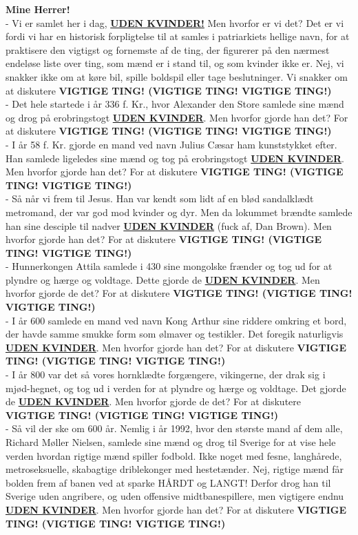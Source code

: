 \textbf{Mine Herrer!}\\
- Vi er samlet her i dag, \underline{\textbf{UDEN KVINDER!}} Men hvorfor er vi det? Det er vi fordi vi har en historisk forpligtelse til at samles i patriarkiets hellige navn, for at praktisere den vigtigst og fornemste af de ting, der figurerer på den nærmest endeløse liste over ting, som mænd er i stand til, og som kvinder ikke er. Nej, vi snakker ikke om at køre bil, spille boldspil eller tage beslutninger. Vi snakker om at diskutere \textbf{VIGTIGE TING! (VIGTIGE TING! VIGTIGE TING!)}\\
- Det hele startede i år 336 f. Kr., hvor Alexander den Store samlede sine mænd og drog på erobringstogt \underline{\textbf{UDEN KVINDER}}. Men hvorfor gjorde han det? For at diskutere \textbf{VIGTIGE TING! (VIGTIGE TING! VIGTIGE TING!)}\\
- I år 58 f. Kr. gjorde en mand ved navn Julius Cæsar ham kunststykket efter. Han samlede ligeledes sine mænd og tog på erobringstogt \underline{\textbf{UDEN KVINDER}}. Men hvorfor gjorde han det? For at diskutere \textbf{VIGTIGE TING! (VIGTIGE TING! VIGTIGE TING!)}\\
- Så når vi frem til Jesus. Han var kendt som lidt af en blød sandalklædt metromand, der var god mod kvinder og dyr. Men da lokummet brændte samlede han sine desciple til nadver \underline{\textbf{UDEN KVINDER}} (fuck af, Dan Brown). Men hvorfor gjorde han det? For at diskutere \textbf{VIGTIGE TING! (VIGTIGE TING! VIGTIGE TING!)}\\
- Hunnerkongen Attila samlede i 430 sine mongolske frænder og tog ud for at plyndre og hærge og voldtage. Dette gjorde de \underline{\textbf{UDEN KVINDER}}. Men hvorfor gjorde de det? For at diskutere \textbf{VIGTIGE TING! (VIGTIGE TING! VIGTIGE TING!)}\\
- I år 600 samlede en mand ved navn Kong Arthur sine riddere omkring et bord, der havde samme smukke form som ølmaver og testikler. Det foregik naturligvis \underline{\textbf{UDEN KVINDER}}. Men hvorfor gjorde han det? For at diskutere \textbf{VIGTIGE TING! (VIGTIGE TING! VIGTIGE TING!)}\\
- I år 800 var det så vores hornklædte forgængere, vikingerne, der drak sig i mjød-hegnet, og tog ud i verden for at plyndre og hærge og voldtage. Det gjorde de \underline{\textbf{UDEN KVINDER}}. Men hvorfor gjorde de det? For at diskutere \textbf{VIGTIGE TING! (VIGTIGE TING! VIGTIGE TING!)}\\
- Så vil der ske om 600 år. Nemlig i år 1992, hvor den største mand af dem alle, Richard Møller Nielsen, samlede sine mænd og drog til Sverige for at vise hele verden hvordan rigtige mænd spiller fodbold. Ikke noget med fesne, langhårede, metroseksuelle, skabagtige driblekonger med hestetænder. Nej, rigtige mænd får bolden frem af banen ved at sparke HÅRDT og LANGT! Derfor drog han til Sverige uden angribere, og uden offensive midtbanespillere, men vigtigere endnu \underline{\textbf{UDEN KVINDER}}. Men hvorfor gjorde han det? For at diskutere \textbf{VIGTIGE TING! (VIGTIGE TING! VIGTIGE TING!)}\\
